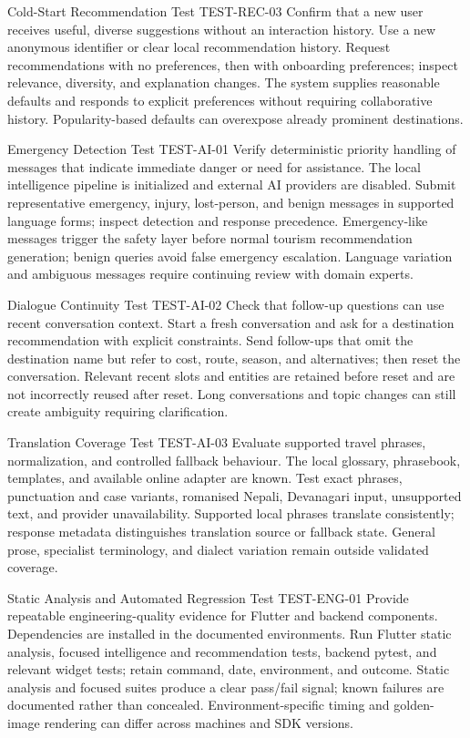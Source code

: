 \EvidenceSheet
{Cold-Start Recommendation Test}
{TEST-REC-03}
{Confirm that a new user receives useful, diverse suggestions without an interaction history.}
{Use a new anonymous identifier or clear local recommendation history.}
{Request recommendations with no preferences, then with onboarding preferences; inspect relevance, diversity, and explanation changes.}
{The system supplies reasonable defaults and responds to explicit preferences without requiring collaborative history.}
{Popularity-based defaults can overexpose already prominent destinations.}

\EvidenceSheet
{Emergency Detection Test}
{TEST-AI-01}
{Verify deterministic priority handling of messages that indicate immediate danger or need for assistance.}
{The local intelligence pipeline is initialized and external AI providers are disabled.}
{Submit representative emergency, injury, lost-person, and benign messages in supported language forms; inspect detection and response precedence.}
{Emergency-like messages trigger the safety layer before normal tourism recommendation generation; benign queries avoid false emergency escalation.}
{Language variation and ambiguous messages require continuing review with domain experts.}

\EvidenceSheet
{Dialogue Continuity Test}
{TEST-AI-02}
{Check that follow-up questions can use recent conversation context.}
{Start a fresh conversation and ask for a destination recommendation with explicit constraints.}
{Send follow-ups that omit the destination name but refer to cost, route, season, and alternatives; then reset the conversation.}
{Relevant recent slots and entities are retained before reset and are not incorrectly reused after reset.}
{Long conversations and topic changes can still create ambiguity requiring clarification.}

\EvidenceSheet
{Translation Coverage Test}
{TEST-AI-03}
{Evaluate supported travel phrases, normalization, and controlled fallback behaviour.}
{The local glossary, phrasebook, templates, and available online adapter are known.}
{Test exact phrases, punctuation and case variants, romanised Nepali, Devanagari input, unsupported text, and provider unavailability.}
{Supported local phrases translate consistently; response metadata distinguishes translation source or fallback state.}
{General prose, specialist terminology, and dialect variation remain outside validated coverage.}

\EvidenceSheet
{Static Analysis and Automated Regression Test}
{TEST-ENG-01}
{Provide repeatable engineering-quality evidence for Flutter and backend components.}
{Dependencies are installed in the documented environments.}
{Run Flutter static analysis, focused intelligence and recommendation tests, backend pytest, and relevant widget tests; retain command, date, environment, and outcome.}
{Static analysis and focused suites produce a clear pass/fail signal; known failures are documented rather than concealed.}
{Environment-specific timing and golden-image rendering can differ across machines and SDK versions.}

